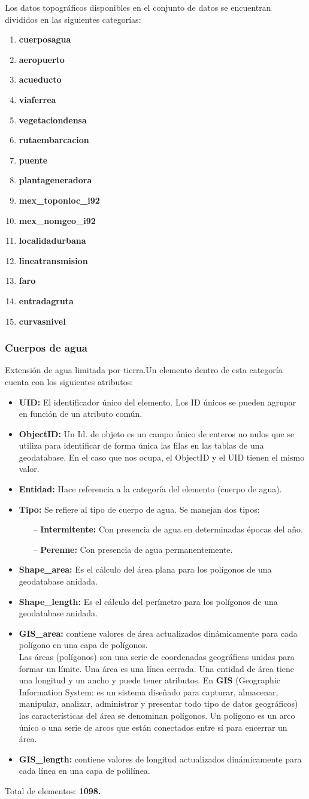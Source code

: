 \documentclass[10pt,letterpaper]{article}
\newcommand{\descripcion}{Un elemento dentro de esta categoría cuenta con los siguientes atributos:}
\newcommand{\total}{Total de elementos: }
\newcommand{\UID}{\textbf{UID:} El identificador único del elemento. Los ID únicos se pueden agrupar en función de un atributo común.}
\newcommand{\OID}{\textbf{ObjectID:} Un Id. de objeto es un campo único de enteros no nulos que se utiliza para identificar de forma única las filas en las tablas de una geodatabase. En el caso que nos ocupa, el ObjectID y el UID tienen el mismo valor.}
\newcommand{\ent}{\textbf{Entidad:} Hace referencia a la categoría del elemento }
\newcommand{\SHA}{\textbf{Shape\_area:} Es el cálculo del área plana para los polígonos de una geodatabase anidada.}
\newcommand{\SHL}{\textbf{Shape\_length:} Es el cálculo del perímetro para los polígonos de una geodatabase anidada.}
\newcommand{\GISA}{\textbf{GIS\_area:} contiene valores de área actualizados dinámicamente para cada polígono en una capa de polígonos.}
\newcommand{\GISL}{\textbf{GIS\_length:} contiene valores de longitud actualizados dinámicamente para cada línea en una capa de polilínea.}
\begin{document}
Los datos topográficos disponibles en el conjunto de datos se encuentran divididos en las siguientes categorías:
\begin{enumerate}
	\item \textbf{cuerposagua}
	\item \textbf{aeropuerto}
	\item \textbf{acueducto}
	\item \textbf{viaferrea}
	\item \textbf{vegetaciondensa}
	\item \textbf{rutaembarcacion}
	\item \textbf{puente}
	\item \textbf{plantageneradora}
	\item \textbf{mex\_toponloc\_i92}
	\item \textbf{mex\_nomgeo\_i92}
	\item \textbf{localidadurbana}
	\item \textbf{lineatransmision}
	\item \textbf{faro}
	\item \textbf{entradagruta}
	\item \textbf{curvasnivel}
\end{enumerate}

\subsubsection{Cuerpos de agua}
Extensión de agua limitada por tierra.\descripcion
\begin{itemize}
	\item \UID
	\item \OID
	\item \ent (cuerpo de agua).
	\item \textbf{Tipo:} Se refiere al tipo de cuerpo de agua. Se manejan dos tipos:
		\begin{itemize}
			\item[--] \textbf{Intermitente:} Con presencia de agua en determinadas épocas del año.
			\item[--] \textbf{Perenne:} Con presencia de agua permanentemente.
		\end{itemize}
	\item \SHA
	\item \SHL
	\item \GISA \\
	Las áreas (polígonos) son una serie de coordenadas geográficas unidas para formar un límite. Una área es una línea cerrada. Una entidad de área tiene una longitud y un ancho y puede tener atributos. En \textbf{GIS} (Geographic Information System: es un sistema diseñado para capturar, almacenar, manipular, analizar, administrar y presentar todo tipo de datos geográficos) las características del área se denominan polígonos. Un polígono es un arco único o una serie de arcos que están conectados entre sí para encerrar un área.
	\item \GISL
\end{itemize}
\total \textbf{1098.}
\end{document}
